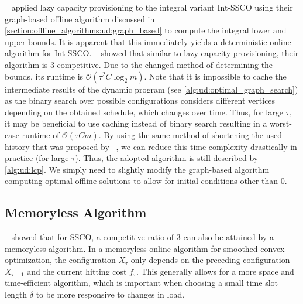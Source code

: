 \citeauthor*{Albers2018}~\cite{Albers2018} applied lazy capacity provisioning to the integral variant Int-SSCO using their graph-based offline algorithm discussed in \cref{section:offline_algorithms:ud:graph_based} to compute the integral lower and upper bounds. It is apparent that this immediately yields a deterministic online algorithm for Int-SSCO. \citeauthor*{Albers2018}~\cite{Albers2018} showed that similar to lazy capacity provisioning, their algorithm is $3$-competitive. Due to the changed method of determining the bounds, its runtime is $\mathcal{O}(\tau^2 C \log_2 m)$. Note that it is impossible to cache the intermediate results of the dynamic program (see \cref{alg:ud:optimal_graph_search}) as the binary search over possible configurations considers different vertices depending on the obtained schedule, which changes over time. Thus, for large $\tau$, it may be beneficial to use caching instead of binary search resulting in a worst-case runtime of $\mathcal{O}(\tau C m)$. By using the same method of shortening the used history that was proposed by \citeauthor*{Lin2011}~\cite{Lin2011}, we can reduce this time complexity drastically in practice (for large $\tau$). Thus, the adopted algorithm is still described by \cref{alg:ud:lcp}. We simply need to slightly modify the graph-based algorithm computing optimal offline solutions to allow for initial conditions other than $0$.

\subsection{Memoryless Algorithm}\label{section:online_algorithms:ud:memoryless}

\citeauthor*{Bansal2015}~\cite{Bansal2015} showed that for SSCO, a competitive ratio of $3$ can also be attained by a memoryless algorithm. In a memoryless online algorithm for smoothed convex optimization, the configuration $X_{\tau}$ only depends on the preceding configuration $X_{\tau-1}$ and the current hitting cost $f_{\tau}$. This generally allows for a more space and time-efficient algorithm, which is important when choosing a small time slot length $\delta$ to be more responsive to changes in load.

